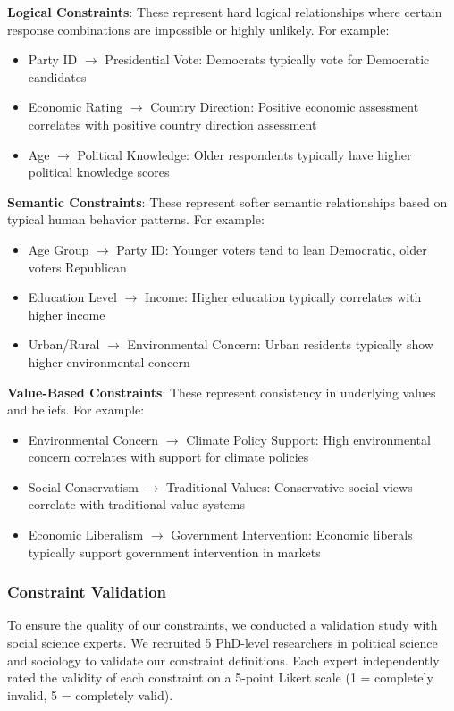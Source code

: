 \documentclass[sigconf, anonymous]{acmart}
\begin{document}
\textbf{Logical Constraints}: These represent hard logical relationships where certain response combinations are impossible or highly unlikely. For example:
\begin{itemize}
    \item Party ID $\rightarrow$ Presidential Vote: Democrats typically vote for Democratic candidates
    \item Economic Rating $\rightarrow$ Country Direction: Positive economic assessment correlates with positive country direction assessment
    \item Age $\rightarrow$ Political Knowledge: Older respondents typically have higher political knowledge scores
\end{itemize}

\textbf{Semantic Constraints}: These represent softer semantic relationships based on typical human behavior patterns. For example:
\begin{itemize}
    \item Age Group $\rightarrow$ Party ID: Younger voters tend to lean Democratic, older voters Republican
    \item Education Level $\rightarrow$ Income: Higher education typically correlates with higher income
    \item Urban/Rural $\rightarrow$ Environmental Concern: Urban residents typically show higher environmental concern
\end{itemize}

\textbf{Value-Based Constraints}: These represent consistency in underlying values and beliefs. For example:
\begin{itemize}
    \item Environmental Concern $\rightarrow$ Climate Policy Support: High environmental concern correlates with support for climate policies
    \item Social Conservatism $\rightarrow$ Traditional Values: Conservative social views correlate with traditional value systems
    \item Economic Liberalism $\rightarrow$ Government Intervention: Economic liberals typically support government intervention in markets
\end{itemize}

\subsubsection{Constraint Validation}

To ensure the quality of our constraints, we conducted a validation study with social science experts. We recruited 5 PhD-level researchers in political science and sociology to validate our constraint definitions. Each expert independently rated the validity of each constraint on a 5-point Likert scale (1 = completely invalid, 5 = completely valid).
\end{document}
